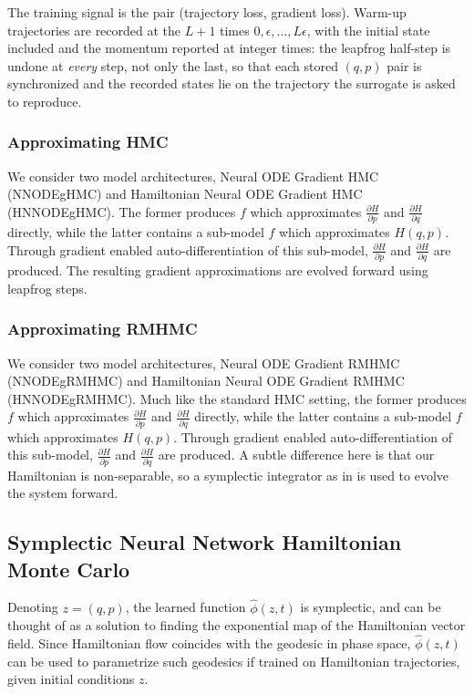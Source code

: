 \documentclass{article}
\theoremstyle{plain}
\theoremstyle{definition}
\theoremstyle{remark}
\begin{document}
The training signal is the pair (trajectory loss, gradient loss). Warm-up
trajectories are recorded at the $L+1$ times $0, \epsilon, \ldots, L\epsilon$,
with the initial state included and the momentum reported at integer times:
the leapfrog half-step is undone at \emph{every} step, not only the last, so
that each stored $(q,p)$ pair is synchronized and the recorded states lie on
the trajectory the surrogate is asked to reproduce.
\subsubsection{Approximating HMC}
We consider two model architectures, Neural ODE Gradient HMC (NNODEgHMC) and Hamiltonian Neural ODE Gradient HMC (HNNODEgHMC). The former produces $f$ which approximates $\frac{\partial H}{\partial p}$ and $\frac{\partial H}{\partial q}$ directly, while the latter contains a sub-model $f$ which approximates $H(q,p)$. Through gradient enabled auto-differentiation of this sub-model, $\frac{\partial H}{\partial p}$ and $\frac{\partial H}{\partial q}$ are produced. The resulting gradient approximations are evolved forward using leapfrog steps. 

\subsubsection{Approximating RMHMC}
We consider two model architectures, Neural ODE Gradient RMHMC (NNODEgRMHMC) and Hamiltonian Neural ODE Gradient RMHMC (HNNODEgRMHMC). Much like the standard HMC setting, the former produces $f$ which approximates $\frac{\partial H}{\partial p}$ and $\frac{\partial H}{\partial q}$ directly, while the latter contains a sub-model $f$ which approximates $H(q,p)$. Through gradient enabled auto-differentiation of this sub-model, $\frac{\partial H}{\partial p}$ and $\frac{\partial H}{\partial q}$ are produced. A subtle difference here is that our Hamiltonian is non-separable, so a symplectic integrator as in \cite{Tao_2016} is used to evolve the system forward. 


\subsection{Symplectic Neural Network Hamiltonian Monte Carlo}
Denoting $z = (q,p)$, the learned function $\hat{\phi}(z,t)$ is symplectic, and can be thought of as a solution to finding the exponential map of the Hamiltonian vector field. Since Hamiltonian flow coincides with the geodesic in phase space, $\hat{\phi}(z,t)$ can be used to parametrize such geodesics if trained on Hamiltonian trajectories, given initial conditions $z$.
\end{document}
